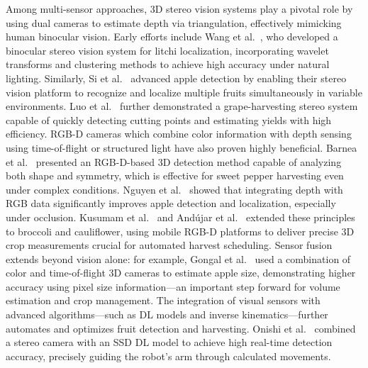 \documentclass[a4paper,fleqn]{cas-dc}
\begin{document}
Among multi-sensor approaches, 3D stereo vision systems play a pivotal role by using dual cameras to estimate depth via triangulation, effectively mimicking human binocular vision. Early efforts include Wang et al.~\cite{wang2016localisation}, who developed a binocular stereo vision system for litchi localization, incorporating wavelet transforms and clustering methods to achieve high accuracy under natural lighting. Similarly, Si et al.~\cite{si2015location} advanced apple detection by enabling their stereo vision platform to recognize and localize multiple fruits simultaneously in variable environments. Luo et al.~\cite{luo2016vision} further demonstrated a grape-harvesting stereo system capable of quickly detecting cutting points and estimating yields with high efficiency.
RGB-D cameras which combine color information with depth sensing using time-of-flight or structured light have also proven highly beneficial. Barnea et al.~\cite{barnea2016colour} presented an RGB-D-based 3D detection method capable of analyzing both shape and symmetry, which is effective for sweet pepper harvesting even under complex conditions. Nguyen et al.~\cite{nguyen2016detection} showed that integrating depth with RGB data significantly improves apple detection and localization, especially under occlusion. Kusumam et al.~\cite{kusumam20173d} and Andújar et al.~\cite{andujar2016using} extended these principles to broccoli and cauliflower, using mobile RGB-D platforms to deliver precise 3D crop measurements crucial for automated harvest scheduling.
Sensor fusion extends beyond vision alone: for example, Gongal et al.~\cite{gongal2018apple} used a combination of color and time-of-flight 3D cameras to estimate apple size, demonstrating higher accuracy using pixel size information—an important step forward for volume estimation and crop management.
The integration of visual sensors with advanced algorithms—such as DL models and inverse kinematics—further automates and optimizes fruit detection and harvesting. Onishi et al.~\cite{onishi2019automated} combined a stereo camera with an SSD DL model to achieve high real-time detection accuracy, precisely guiding the robot’s arm through calculated movements.
\end{document}
